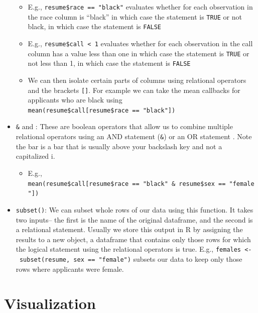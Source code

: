 \documentclass[
  letterpaper,
  DIV=11,
  numbers=noendperiod]{scrreprt}
\providecommand{\tightlist}{%
  \setlength{\itemsep}{0pt}\setlength{\parskip}{0pt}}\usepackage{longtable,booktabs,array}
\begin{document}
\begin{itemize}
  \begin{itemize}
  \tightlist
  \item
    E.g., \texttt{resume\$race\ ==\ "black"} evaluates whether for each
    observation in the race column is ``black'' in which case the
    statement is \texttt{TRUE} or not black, in which case the statement
    is \texttt{FALSE}
  \item
    E.g., \texttt{resume\$call\ \textless{}\ 1} evaluates whether for
    each observation in the call column has a value less than one in
    which case the statement is \texttt{TRUE} or not less than 1, in
    which case the statement is \texttt{FALSE}
  \item
    We can then isolate certain parts of columns using relational
    operators and the brackets \texttt{{[}{]}}. For example we can take
    the mean callbacks for applicants who are black using
    \texttt{mean(resume\$call{[}resume\$race\ ==\ "black"{]})}
  \end{itemize}
\item
  \texttt{\&} and \texttt{\textbar{}}: These are boolean operators that
  allow us to combine multiple relational operators using an AND
  statement (\texttt{\&}) or an OR statement \texttt{\textbar{}}. Note
  the bar is a bar that is usually above your backslash key and not a
  capitalized i.

  \begin{itemize}
  \tightlist
  \item
    E.g.,
    \texttt{mean(resume\$call{[}resume\$race\ ==\ "black"\ \&\ resume\$sex\ ==\ "female"{]})}
  \end{itemize}
\item
  \texttt{subset()}: We can subset whole rows of our data using this
  function. It takes two inputs-- the first is the name of the original
  dataframe, and the second is a relational statement. Usually we store
  this output in R by assigning the results to a new object, a dataframe
  that contains only those rows for which the logical statement using
  the relational operators is true. E.g.,
  \texttt{females\ \textless{}-\ subset(resume,\ sex\ ==\ "female")}
  subsets our data to keep only those rows where applicants were female.
\end{itemize}


\hypertarget{visualization}{%
\chapter{Visualization}\label{visualization}}
\end{document}

